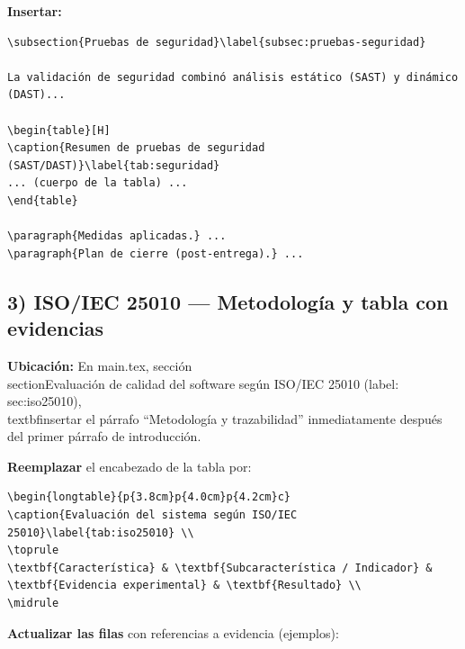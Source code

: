 \textbf{Insertar:}

\begin{verbatim}
\subsection{Pruebas de seguridad}\label{subsec:pruebas-seguridad}

La validación de seguridad combinó análisis estático (SAST) y dinámico (DAST)...

\begin{table}[H]
\caption{Resumen de pruebas de seguridad (SAST/DAST)}\label{tab:seguridad}
... (cuerpo de la tabla) ...
\end{table}

\paragraph{Medidas aplicadas.} ...
\paragraph{Plan de cierre (post-entrega).} ...
\end{verbatim}

\subsection*{3) ISO/IEC 25010 — Metodología y tabla con evidencias}

\textbf{Ubicación:} En main.tex, sección \\section{Evaluación de calidad del software según ISO/IEC 25010} (label: sec:iso25010), \\textbf{insertar el párrafo} ``Metodología y trazabilidad'' inmediatamente después del primer párrafo de introducción.

\textbf{Reemplazar} el encabezado de la tabla por:

\begin{verbatim}
\begin{longtable}{p{3.8cm}p{4.0cm}p{4.2cm}c}
\caption{Evaluación del sistema según ISO/IEC 25010}\label{tab:iso25010} \\
\toprule
\textbf{Característica} & \textbf{Subcaracterística / Indicador} & \textbf{Evidencia experimental} & \textbf{Resultado} \\
\midrule
\end{verbatim}

\textbf{Actualizar las filas} con referencias a evidencia (ejemplos):

